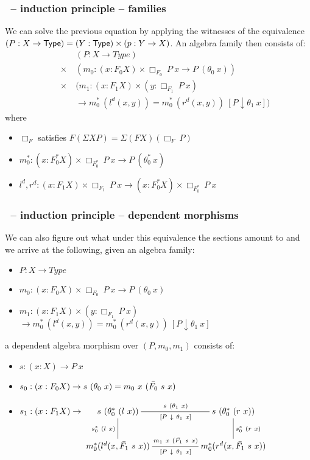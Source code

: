 \documentclass{beamer}
\begin{document}
 \begin{frame}
   \frametitle{\onehits\ -- induction principle -- families}
   We can solve the previous equation by applying the witnesses of the
   equivalence $(P : X \to \mathsf{Type}) = (Y : \mathsf{Type}) \times (p : Y \to
   X)$. An algebra family then consists of:
   \begin{align*}
     &&&\ (P : X \to Type) \\
     &&\times&\ (m_0 : (x : F_0 X) \times \Box_{F_0}\ P\ x \to P\ (\theta_0\ x)) \\
     &&\times&\ (m_1 : (x : F_1 X) \times (y : \Box_{F_1}\ P\ x) \\
     &&&\ \to  m_0^*\ (l^d (x , y)) = m_0^*\ (r^d (x , y))\ [ P \downarrow \theta_1\ x ])
   \end{align*}
   where
   
   \begin{itemize}
   \item $\Box_F$ satisfies $F (\Sigma X P) = \Sigma (FX) (\Box_{F}\ P)$
   \item $m_0^* : (x : F_0^* X) \times \Box_{F_0^*}\ P\ x \to P\ (\theta_0^*\ x)$
   \item $l^d , r^d : (x : F_1 X) \times \Box_{F_1}\ P\ x \to (x : F_0^* X) \times \Box_{F_0^*}\ P\ x$
   \end{itemize}
\end{frame}

 \begin{frame}
   \frametitle{\onehits\ -- induction principle -- dependent morphisms}
   We can also figure out what under this equivalence the sections
   amount to and we arrive at the following, given an algebra family:
   \begin{itemize}
     \item $P : X \to Type$
     \item $m_0 : (x : F_0 X) \times \Box_{F_0}\ P\ x \to P\ (\theta_0\ x)$
     \item $m_1 : (x : F_1 X) \times (y : \Box_{F_1}\ P\ x)$ $\to  m_0^*\ (l^d (x , y)) = m_0^*\ (r^d (x , y))\ [ P \downarrow \theta_1\ x ]$
   \end{itemize}
   a dependent algebra morphism over $(P,m_0,m_1)$ consists of:
   \begin{itemize}
   \item $s : (x : X) \to P\ x$
   \item $s_0 : (x : F_0 X) \to s\ (\theta_0\ x) = m_0\ x\ (\bar{F_0}\ s\ x)$
   \item $s_1 : (x : F_1 X) \to \xymatrix{
       s\ (\theta_0^*\ (l\ x)) 
       \ar@{-}[rr]^{s\ (\theta_1\ x)}_{[ P\ \downarrow\ \theta_1\ x ]}
       \ar@{-}[d]_{s_0^*\ (l\ x)}
       &&s\ (\theta_0^*\ (r\ x)) 
       \ar@{-}[d]^{s_0^*\ (r\ x)} \\
       m_0^* (l^d (x , \actionsection{F_1}\ s\ x)) 
       \ar@{-}[rr]^{m_1\ x\ (\actionsection{F_1}\ s\ x)}_{[ P\ \downarrow\ \theta_1\ x ]}
       &&m_0^* (r^d (x , \actionsection{F_1}\ s\ x))} $
   \end{itemize}

 \end{frame}
\end{document}
